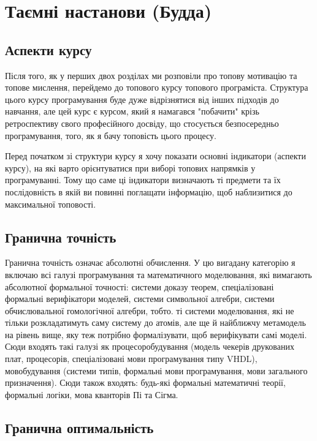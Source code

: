 \section{Таємні настанови (Будда)}

\subsection{Аспекти курсу}

Після того, як у перших двох розділах ми розповіли про
топову мотивацію та топове мислення, перейдемо до топового
курсу топового програміста. Структура цього курсу програмування
буде дуже відрізнятися від інших підходів до навчання, але цей
курс є курсом, який я намагався "побачити" крізь ретроспективу
свого професійного досвіду, що стосується безпосередньо
програмування, того, як я бачу топовість цього процесу.

Перед початком зі структури курсу я хочу показати основні
індикатори (аспекти курсу), на які варто орієнтуватися при
виборі топових напрямків у програмуванні. Тому що саме ці
індикатори визначають ті предмети та їх послідовність в
якій ви повинні поглащати інформацію, щоб наблизитися до
максимальної топовості.

\subsection{Гранична точність}

Гранична точність означає абсолютні обчислення. У цю вигадану
категорію я включаю всі галузі програмування та математичного
моделювання, які вимагають абсолютної формальної точності:
системи доказу теорем, спеціалізовані формальні верифікатори
моделей, системи символьної алгебри, системи обчислювальної
гомологічної алгебри, тобто. ті системи моделювання, які не
тільки розкладатимуть саму систему до атомів, але ще й найближчу
метамодель на рівень вище, яку теж потрібно формалізувати, щоб
верифікувати самі моделі. Сюди входять такі галузі як
процесоробудування (модель чекерів друкованих плат,
процесорів, спеціалізовані мови програмування типу VHDL),
мовобудування (системи типів, формальні мови програмування,
мови загального призначення). Сюди також входять: будь-які
формальні математичні теорії, формальні логіки, мова кванторів Пі та Сігма.

\subsection{Гранична оптимальність}

